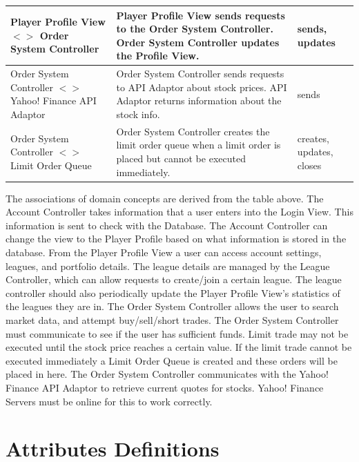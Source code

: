 \begin{centering}
\begin{longtable}{|p{1.75in}| p{3in}| p{1.75in} |}
           Player Profile View $<>$ Order System Controller
           & Player Profile View sends requests to the Order System Controller.
           Order System Controller updates the Profile View.\
           & sends, updates \\ \hline

           Order System Controller $<>$ Yahoo! Finance API Adaptor
           & Order System Controller sends requests to API Adaptor about stock prices.
           API Adaptor returns information about the stock info.
           & sends \\ \hline

           Order System Controller $<>$ Limit Order Queue
           & Order System Controller creates the limit order queue when a limit order
           is placed but cannot be executed immediately.
           & creates, updates, closes\\ \hline

\end{longtable}
\end{centering}

The associations of domain concepts are derived from the table above.
The Account Controller takes information that a user enters into the
Login View. This information is sent to check with the Database. The
Account Controller can change the view to the Player Profile based on
what information is stored in the database. From the Player Profile
View a user can access account settings, leagues, and portfolio details.
The league details are managed by the League Controller, which can allow
requests to create/join a certain league. The league controller should
also periodically update the Player Profile View’s statistics of the
leagues they are in. The Order System Controller allows the user to
search market data, and attempt buy/sell/short trades. The Order System
Controller must communicate to see if the user has sufficient funds.
Limit trade may not be executed until the stock price reaches a certain
value. If the limit trade cannot be executed immediately a Limit Order
Queue is created and these orders will be placed in here. The Order
System Controller communicates with the Yahoo! Finance API Adaptor to
retrieve current quotes for stocks. Yahoo! Finance Servers must be
online for this to work correctly. \\

\section{Attributes Definitions}

